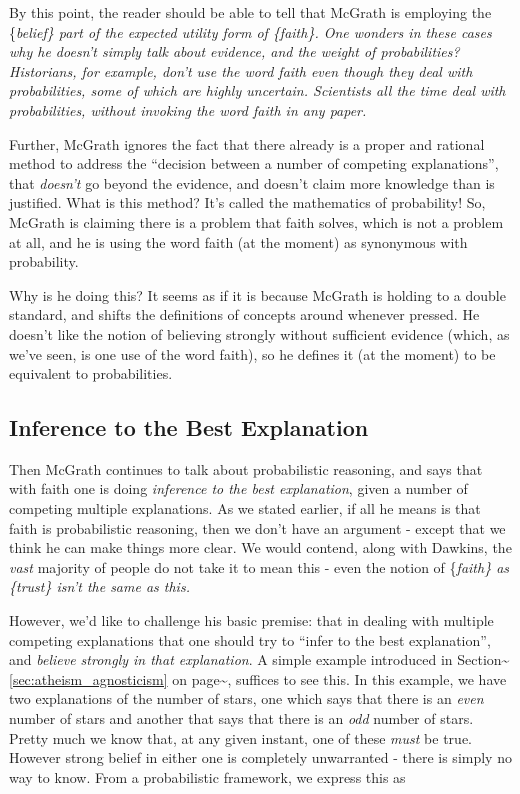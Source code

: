 \documentclass{tufte-book}
\begin{document}
By this point, the reader should be able to tell that McGrath is
employing the \{\em belief\} part of the expected utility form of
\{\em faith\}. One wonders in these cases why he doesn't simply talk
about evidence, and the weight of probabilities? Historians, for
example, don't use the word \emph{faith} even though they deal with
probabilities, some of which are highly uncertain. Scientists all the
time deal with probabilities, without invoking the word \emph{faith} in
any paper.

Further, McGrath ignores the fact that there already is a proper and
rational method to address the ``decision between a number of competing
explanations'', that \emph{doesn't} go beyond the evidence, and doesn't
claim more knowledge than is justified. What is this method? It's called
the mathematics of probability! So, McGrath is claiming there is a
problem that faith solves, which is not a problem at all, and he is
using the word faith (at the moment) as synonymous with probability.

Why is he doing this? It seems as if it is because McGrath is holding to
a double standard, and shifts the definitions of concepts around
whenever pressed. He doesn't like the notion of believing strongly
without sufficient evidence (which, as we've seen, is one use of the
word faith), so he defines it (at the moment) to be equivalent to
probabilities.

\subsection{Inference to the Best Explanation}

Then McGrath continues to talk about probabilistic reasoning, and says
that with faith one is doing \emph{inference to the best
explanation}, given a number of competing multiple explanations. As we
stated earlier, if all he means is that faith is probabilistic
reasoning, then we don't have an argument - except that we think he can
make things more clear. We would contend, along with Dawkins, the
\emph{vast} majority of people do not take it to mean this - even the
notion of \{\em faith\} as \{\em trust\} isn't the same as this.

However, we'd like to challenge his basic premise: that in dealing with
multiple competing explanations that one should try to ``infer to the
best explanation'', and \emph{believe strongly in that
explanation}. A simple example introduced in
Section\textasciitilde{}\ref{sec:atheism_agnosticism} on
page\textasciitilde{}\pageref{sec:atheism_agnosticism}, suffices to see
this. In this example, we have two explanations of the number of stars,
one which says that there is an \emph{even} number of stars and another
that says that there is an \emph{odd} number of stars. Pretty much we
know that, at any given instant, one of these \emph{must} be true.
However strong belief in either one is completely unwarranted - there is
simply no way to know. From a probabilistic framework, we express this
as
\end{document}
